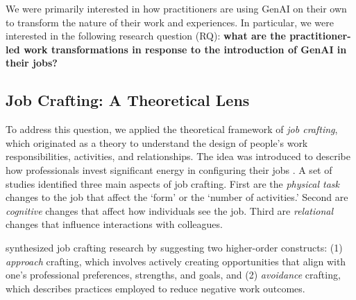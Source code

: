We were primarily interested in how practitioners are using GenAI on their own to transform the nature of their work and experiences. In particular, we were interested in the following research question (RQ): \textbf{what are the practitioner-led work transformations in response to the introduction of GenAI in their jobs?}


\subsection{Job Crafting: A Theoretical Lens} \label{RW-jobcrafting}
To address this question, we applied the theoretical framework of \textit{job crafting}, which originated as a theory to understand the design of people's work responsibilities, activities, and relationships. 
The idea was introduced to describe how professionals invest significant energy in configuring their jobs \cite{Wrzesniewski_2001}. A set of studies identified three main aspects of job crafting. First are the \textit{physical task} changes to the job that affect the `form' or the `number of activities.' Second are \textit{cognitive} changes that affect how individuals see the job. Third are \textit{relational} changes that influence interactions with colleagues. 

\cite{zhang_2019} synthesized job crafting research by suggesting two higher-order constructs: (1) \textit{approach} crafting, which involves actively creating opportunities that align with one's professional preferences, strengths, and goals, and (2) \textit{avoidance} crafting, which describes practices employed to reduce negative work outcomes. 

